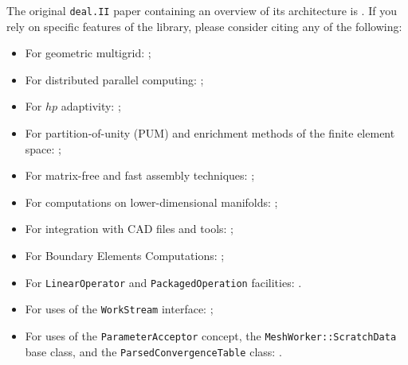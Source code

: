 \documentclass{ansarticle-preprint}
\newcommand{\specialword}[1]{\texttt{#1}}
\newcommand{\dealii}{{\specialword{deal.II}}\xspace}
\begin{document}
The original \texttt{\dealii} paper containing an overview of its
architecture is \cite{BangerthHartmannKanschat2007}. If you rely on
specific features of the library, please consider citing any of the
following:
\begin{itemize}
 \item For geometric multigrid: \cite{Kanschat2004,JanssenKanschat2011,ClevengerHeisterKanschatKronbichler2019};
 \item For distributed parallel computing: \cite{BangerthBursteddeHeisterKronbichler11};
 \item For $hp$ adaptivity: \cite{BangerthKayserHerold2007};
  \item For partition-of-unity (PUM) and enrichment methods of the
    finite element space: \cite{Davydov2016};
 \item For matrix-free and fast assembly techniques:
   \cite{KronbichlerKormann2012,KronbichlerKormann2019};
 \item For computations on lower-dimensional manifolds:
   \cite{DeSimoneHeltaiManigrasso2009};
 \item For integration with CAD files and tools:
   \cite{HeltaiMola2015};
 \item For Boundary Elements Computations:
   \cite{GiulianiMolaHeltai-2018-a};
 \item For \texttt{LinearOperator} and \texttt{PackagedOperation} facilities:
   \cite{MaierBardelloniHeltai-2016-a,MaierBardelloniHeltai-2016-b}.
 \item For uses of the \texttt{WorkStream} interface:
   \cite{TKB16};
   \item For uses of the \texttt{ParameterAcceptor} concept, the
     \texttt{MeshWorker::ScratchData} base class, and the
     \texttt{ParsedConvergenceTable} class: \cite{SartoriGiulianiBardelloni-2018-a}.
\end{itemize}
\end{document}
